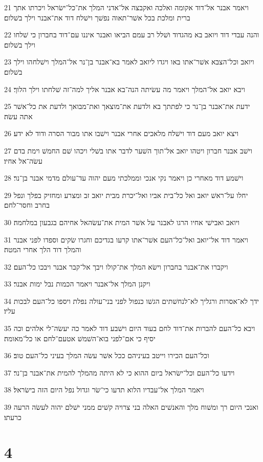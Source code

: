 \par 21 ויאמר אבנר אל־דוד אקומה ואלכה ואקבצה אל־אדני המלך את־כל־ישׂראל ויכרתו אתך ברית ומלכת בכל אשׁר־תאוה נפשׁך וישׁלח דוד את־אבנר וילך בשׁלום׃
\par 22 והנה עבדי דוד ויואב בא מהגדוד ושׁלל רב עמם הביאו ואבנר איננו עם־דוד בחברון כי שׁלחו וילך בשׁלום׃
\par 23 ויואב וכל־הצבא אשׁר־אתו באו ויגדו ליואב לאמר בא־אבנר בן־נר אל־המלך וישׁלחהו וילך בשׁלום׃
\par 24 ויבא יואב אל־המלך ויאמר מה עשׂיתה הנה־בא אבנר אליך למה־זה שׁלחתו וילך הלוך׃
\par 25 ידעת את־אבנר בן־נר כי לפתתך בא ולדעת את־מוצאך ואת־מבואך ולדעת את כל־אשׁר אתה עשׂה׃
\par 26 ויצא יואב מעם דוד וישׁלח מלאכים אחרי אבנר וישׁבו אתו מבור הסרה ודוד לא ידע׃
\par 27 וישׁב אבנר חברון ויטהו יואב אל־תוך השׁער לדבר אתו בשׁלי ויכהו שׁם החמשׁ וימת בדם עשׂה־אל אחיו׃
\par 28 וישׁמע דוד מאחרי כן ויאמר נקי אנכי וממלכתי מעם יהוה עד־עולם מדמי אבנר בן־נר׃
\par 29 יחלו על־ראשׁ יואב ואל כל־בית אביו ואל־יכרת מבית יואב זב ומצרע ומחזיק בפלך ונפל בחרב וחסר־לחם׃
\par 30 ויואב ואבישׁי אחיו הרגו לאבנר על אשׁר המית את־עשׂהאל אחיהם בגבעון במלחמה׃
\par 31 ויאמר דוד אל־יואב ואל־כל־העם אשׁר־אתו קרעו בגדיכם וחגרו שׂקים וספדו לפני אבנר והמלך דוד הלך אחרי המטה׃
\par 32 ויקברו את־אבנר בחברון וישׂא המלך את־קולו ויבך אל־קבר אבנר ויבכו כל־העם׃
\par 33 ויקנן המלך אל־אבנר ויאמר הכמות נבל ימות אבנר׃
\par 34 ידך לא־אסרות ורגליך לא־לנחשׁתים הגשׁו כנפול לפני בני־עולה נפלת ויספו כל־העם לבכות עליו׃
\par 35 ויבא כל־העם להברות את־דוד לחם בעוד היום וישׁבע דוד לאמר כה יעשׂה־לי אלהים וכה יסיף כי אם־לפני בוא־השׁמשׁ אטעם־לחם או כל־מאומה׃
\par 36 וכל־העם הכירו וייטב בעיניהם ככל אשׁר עשׂה המלך בעיני כל־העם טוב׃
\par 37 וידעו כל־העם וכל־ישׂראל ביום ההוא כי לא היתה מהמלך להמית את־אבנר בן־נר׃
\par 38 ויאמר המלך אל־עבדיו הלוא תדעו כי־שׂר וגדול נפל היום הזה בישׂראל׃
\par 39 ואנכי היום רך ומשׁוח מלך והאנשׁים האלה בני צרויה קשׁים ממני ישׁלם יהוה לעשׂה הרעה כרעתו׃

\chapter{4}

